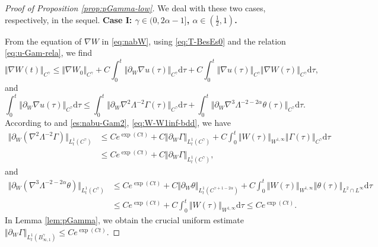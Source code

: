\documentclass[reqno,11pt,a4paper]{amsart}
\newcommand{\dd}{\mathrm{d}}
\begin{document}
\begin{proof}[Proof of Proposition \ref{prop:pGamma-low}]
We deal with these two cases, respectively, in the sequel.
\vskip1mm
\textbf{Case I: $\gamma\in (0,2\alpha-1]$, $\alpha\in (\frac{1}{2},1)$.}
\vskip1mm

From the equation of $\nabla W$ in \eqref{eq:nabW}, using \eqref{eq:T-BesEs0} and the relation \eqref{eq:u-Gam-rela}, 
we find
\begin{equation}\label{eq:nabW-Cgam-1}
  \Vert \nabla W(t)\Vert _{C^\gamma} \leq \Vert \nabla W_0\Vert _{C^\gamma} 
  + C \int_0^t \Vert \partial_W \nabla u(\tau)\Vert _{C^\gamma} \dd \tau 
  + C \int_0^t \Vert \nabla u(\tau)\Vert _{C^\gamma} \Vert \nabla W(\tau)\Vert _{C^\gamma} \dd \tau, 
\end{equation}
and
\begin{equation}\label{eq:parW-nab-u-L1Cgam}
  \int_0^t \Vert \partial_W \nabla u(\tau)\Vert _{C^\gamma} \dd \tau 
  \leq  \int_0^t \Vert \partial_W \nabla^2 \Lambda^{-2} \Gamma(\tau)\Vert _{C^\gamma} \dd \tau 
  +  \int_0^t \Vert \partial_W \nabla^3 \Lambda^{-2-2\alpha} \theta(\tau)\Vert _{C^\gamma} \dd \tau .
\end{equation}
According to \cite[pp. 1416-1417]{LXY25} and \eqref{es:nabu-Gam2}, \eqref{eq:W-W1inf-bdd}, we have
\begin{equation}\label{eq:parW-Gam-L1Cgam1}
\begin{split}
  \Vert \partial_W(\nabla^2 \Lambda^{-2} \Gamma)\Vert _{L^1_t(C^\gamma)}
  & \leq C e^{\exp(Ct)} + 
  C \Vert \partial_W \Gamma\Vert _{L^1_t(C^\gamma)} 
  + C \int_0^t \Vert W(\tau)\Vert _{W^{1,\infty}} \Vert \Gamma(\tau)\Vert _{C^\gamma}\dd \tau \\
  & \leq C e^{\exp(Ct)} +  C \Vert \partial_W \Gamma\Vert _{L^1_t(C^\gamma)} ,
\end{split}
\end{equation}
and
\begin{align}\label{eq:parW-the-L1Cgam1}
  \Vert \partial_W(\nabla^3 \Lambda^{-2-2\alpha}\theta)\Vert _{L^1_t(C^\gamma)}
  & \leq C e^{\exp(Ct)} + C \Vert \partial_W\theta\Vert _{L^1_t(C^{\gamma+1-2\alpha})} + C \int_0^t \Vert W(\tau)\Vert _{W^{1,\infty}}
  \Vert \theta(\tau)\Vert _{L^2\cap L^\infty} \dd \tau \nonumber \\
  & \leq C e^{\exp(Ct)} + C \int_0^t \Vert W(\tau)\Vert _{W^{1,\infty}} \dd \tau \leq C e^{\exp(Ct)} .
\end{align}
In Lemma \ref{lem:pGamma}, we obtain the crucial uniform estimate $\Vert \partial_W \Gamma\Vert _{L^1_t(B^\gamma_{\infty,1})} \leq C e^{\exp(Ct)}$. 

\end{proof}
\end{document}

